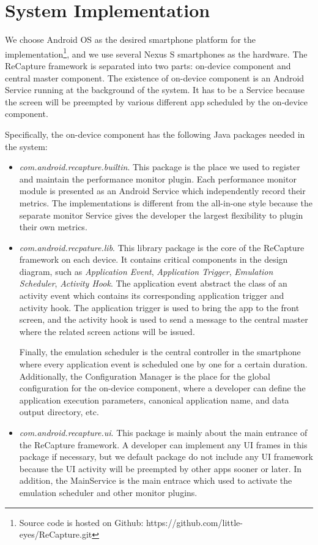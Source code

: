 \section{System Implementation} \label{sec:implementation}
We choose Android OS as the desired smartphone platform for the implementation\footnote{Source code is hosted on Github: https://github.com/little-eyes/ReCapture.git}, and we use several Nexus S smartphones as the hardware. The ReCapture framework is separated into two parts: on-device component and central master component. The existence of on-device component is an Android Service running at the background of the system. It has to be a Service because the screen will be preempted by various different app scheduled by the on-device component.

Specifically, the on-device component has the following Java packages needed in the system:
\begin{itemize}
\item \emph{com.android.recapture.builtin}. This package is the place we used to register and maintain the performance monitor plugin. Each performance monitor module is presented as an Android Service which independently record their metrics. The implementations is different from the all-in-one style because the separate monitor Service gives the developer the largest flexibility to plugin their own metrics.

\item \emph{com.android.recpature.lib}. This library package is the core of the ReCapture framework on each device. It contains critical components in the design diagram, such as \emph{Application Event}, \emph{Application Trigger}, \emph{Emulation Scheduler}, \emph{Activity Hook}. The application event abstract the class of an activity event which contains its corresponding application trigger and activity hook. The application trigger is used to bring the app to the front screen, and the activity hook is used to send a message to the central master where the related screen actions will be issued.

Finally, the emulation scheduler is the central controller in the smartphone where every application event is scheduled one by one for a certain duration. Additionally, the Configuration Manager is the place for the global configuration for the on-device component, where a developer can define the application execution parameters, canonical application name, and data output directory, etc.

\item\emph{com.android.recapture.ui}. This package is mainly about the main entrance of the ReCapture framework. A developer can implement any UI frames in this package if necessary, but we default package do not include any UI framework because the UI activity will be preempted by other apps sooner or later. In addition, the MainService is the main entrace which used to activate the emulation scheduler and other monitor plugins.
\end{itemize}

